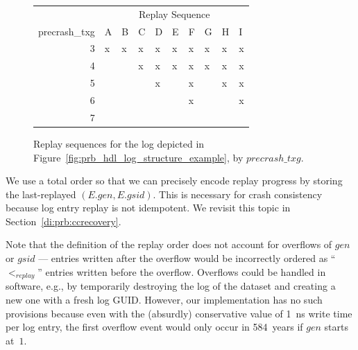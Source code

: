 \documentclass[12pt,a4paper,twoside]{book}
\begin{document}
\begin{figure}[H]
    \centering
        \begin{tabular}{r|l|l|l|l|l|l|l|l|l|}
        \multicolumn{1}{l|}{}              & \multicolumn{9}{c|}{Replay Sequence} \\
        \multicolumn{1}{c|}{precrash\_txg} & A  & B  & C  & D & E & F & G & H & I \\ \hline
        3                                  & x  & x  & x  & x & x & x & x & x & x \\
        4                                  &    &    & x  & x & x & x & x & x & x \\
        5                                  &    &    &    & x &   & x &   & x & x \\
        6                                  &    &    &    &   &   & x &   &   & x \\
        7                                  &    &    &    &   &   &   &   &   &   \\ \cline{2-10} 
    \end{tabular}
    \caption{Replay sequences for the log depicted in Figure~\ref{fig:prb_hdl_log_structure_example}, by $precrash\_txg$. }
    \label{fig:prb_hdl_log_structure_example__replay}
\end{figure}

We use a total order so that we can precisely encode replay progress by storing the last-replayed $(E.gen, E.gsid)$.
This is necessary for crash consistency because log entry replay is not idempotent.
We revisit this topic in Section~\ref{di:prb:ccrecovery}.

Note that the definition of the replay order does not account for overflows of $gen$ or $gsid$ --- entries written after the overflow would be incorrectly ordered as ``$<_{replay}$'' entries written before the overflow.
Overflows could be handled in software, e.g., by temporarily destroying the log of the dataset and creating a new one with a fresh log GUID.
However, our implementation has no such provisions because even with the (absurdly) conservative value of 1~ns write time per log entry, the first overflow event would only occur in 584~years if $gen$ starts at~$1$.
\end{document}
